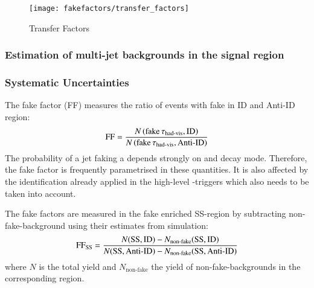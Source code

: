 \begin{figure}[htbp]
  \centering

  \texttt{[image: fakefactors/transfer\_factors]}

  \caption{Transfer Factors}
  \label{fig:mjfakes_transfer_factor}
\end{figure}


\subsubsection{Estimation of multi-jet backgrounds in the signal region}


\subsubsection{Systematic Uncertainties}









The fake factor (FF) measures the ratio of events with fake \tauhadvis in ID and
Anti-ID region:
\begin{align*}
  \text{FF} = \frac{N\left( \text{fake} \, \tau_{\text{had-vis}}, \text{ID} \right)}{N\left( \text{fake} \, \tau_{\text{had-vis}}, \text{Anti-ID} \right)}
\end{align*}
The probability of a jet faking a \tauhadvis depends strongly on \tauhadvis \pT
and decay mode. Therefore, the fake factor is frequently parametrised in these
quantities. It is also affected by the \tauhadvis identification already applied
in the high-level \tauhadvis-triggers which also needs to be taken into account.

The fake factors are measured in the fake enriched SS-region by subtracting
non-fake-\tauhadvis background using their estimates from simulation:
\begin{align*}
  \text{FF}_\text{SS} = \frac{N(\text{SS}, \text{ID}) - N_\text{non-fake}(\text{SS}, \text{ID})}{N(\text{SS}, \text{Anti-ID}) - N_\text{non-fake}(\text{SS}, \text{Anti-ID})}
\end{align*}
where $N$ is the total yield and $N_\text{non-fake}$ the yield of
non-fake-\tauhadvis backgrounds in the corresponding region.

